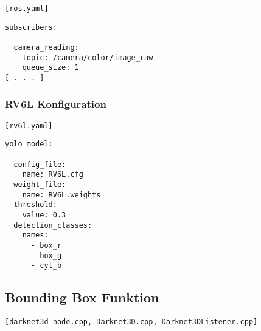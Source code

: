 \lstinline{[ros.yaml]}

\begin{lstlisting}
subscribers:

  camera_reading:
    topic: /camera/color/image_raw
    queue_size: 1
[ . . . ]
\end{lstlisting}

\subsubsection{RV6L Konfiguration} \label{subsec:darknet_rv6lconfig}

\lstinline{[rv6l.yaml]}

\begin{lstlisting}
yolo_model:

  config_file:
    name: RV6L.cfg
  weight_file:
    name: RV6L.weights
  threshold:
    value: 0.3
  detection_classes:
    names:
      - box_r
      - box_g
      - cyl_b
\end{lstlisting}

\subsection{Bounding Box Funktion} \label{subsec:bounding_funkt}

\lstinline{[darknet3d_node.cpp, Darknet3D.cpp, Darknet3DListener.cpp]}

